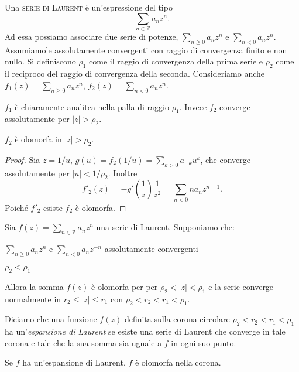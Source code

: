 \begin{defn}
    Una \textsc{serie di Laurent} \`e un'espressione del tipo
    \[
        \sum_{n\in \mathbb{Z}}a_n z^n.
    \]
    Ad essa possiamo associare due serie di potenze, $\sum_{n\geq 0}a_n z^n$ e
    $\sum_{n< 0}a_n z^n$. Assumiamole assolutamente convergenti con raggio di
    convergenza finito e non nullo.
    Si definiscono $\rho_1$ come il raggio di convergenza della prima serie e
    $\rho_2$ come il reciproco del raggio di convergenza della seconda.
    Consideriamo anche $f_1(z)=\sum_{n\geq 0}a_n z^n$, $f_2(z)=\sum_{n< 0}a_n
    z^n$.
\end{defn}
$f_1$ \`e chiaramente analitca nella palla di raggio $\rho_1$. Invece $f_2$
converge assolutamente per $|z|>\rho_2$.

\begin{prop} $f_2$ \`e olomorfa in $|z|>\rho_2$.
\end{prop}
\begin{proof}
    Sia $z=1/u$, $g(u) = f_2(1/u) = \sum_{k>0}a_{-k}u^k$, che converge
    assolutamente per $|u|<1/\rho_2$. Inoltre
    \[
        f'_2(z) = -g'\left(\frac{1}{z}\right)\frac{1}{z^2} = \sum_{n<0}na_nz^{n-1}.
    \]
    Poich\'e $f'_2$ esiste $f_2$ \`e olomorfa.
\end{proof}

\begin{prop}
    Sia $f(z)=\sum_{n\in\mathbb{Z}}a_nz^n$ una serie di Laurent. Supponiamo che:
    \begin{nlist}
        \item $\sum_{n\geq 0}a_nz^n$ e $\sum_{n<0}a_nz^{-n}$ assolutamente
            convergenti
        \item $\rho_2<\rho_1$
    \end{nlist}
    Allora la somma $f(z)$ \`e olomorfa per per $\rho_2<|z|<\rho_1$ e la serie
    converge normalmente in $r_2\leq |z| \leq r_1$ con $\rho_2<r_2<r_1<\rho_1$.
\end{prop}

\begin{defn}
    Diciamo che una funzione $f(z)$ definita sulla corona circolare
    $\rho_2<r_2<r_1<\rho_1$ ha un'\textit{espansione di Laurent} se esiste una serie di
    Laurent che converge in tale corona e tale che la sua somma sia uguale a $f$ in
    ogni suo punto.
\end{defn}

\begin{oss}
    Se $f$ ha un'espansione di Laurent, $f$ \`e olomorfa nella corona.
\end{oss}

